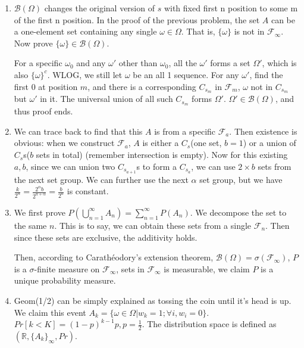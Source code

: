 \documentclass{article}
\theoremstyle{definition}
\begin{document}
\begin{enumerate}
		Then prove $\mathcal F_\infty \neq \Omega$. Let $A$ be an all 1 sequence. No matter how big n is, there can't be a $C_{s_n}=A$. Since $\{C_s\}$ is a partition, we can't get $A$ through intersection. $A$ is not in any of $\mathcal F_n$. $A$ is in $2^\Omega$ but $A$ is not in $\mathcal F_\infty$.
		
		\item $\mathcal B(\Omega)$ changes the original version of $s$ with fixed first n position to some m of the first n position. In the proof of the previous problem, the set $A$ can be a one-element set containing any single $\omega \in \Omega$. That is, $\{\omega\}$ is not in $\mathcal F_\infty$. Now prove $\{\omega\} \in \mathcal B(\Omega)$. 
		
		For a specific $\omega_0$ and any $\omega'$ other than $\omega_0$, all the $\omega'$ forms a set $\Omega'$, which is also $\{\omega\}^c$. WLOG, we still let $\omega$ be an all 1 sequence. For any $\omega'$, find the first 0 at position $m$, and there is a corresponding $C_{s_m}$ in $\mathcal F_m$, $\omega$ not in $C_{s_m}$ but $\omega'$ in it. The universal union of all such $C_{s_m}$ forms $\Omega'$. $\Omega'\in\mathcal B(\Omega)$, and thus proof ends. 		
		
		\item We can trace back to find that this $A$ is from a specific $\mathcal F_a$. Then existence is obvious: when we construct $\mathcal F_a$, $A$ is either a $C_s$(one set, $b=1$) or a union of $C_s$s($b$ sets in total) (remember intersection is empty). Now for this existing $a, b$, since we can union two $C_{s_{a+1}}$s to form a $C_{s_a}$, we can use $2\times b$ sets from the next set group. We can further use the next $\alpha$ set group, but we have $\frac{k}{2^n} = \frac{2^\alpha b}{2^{a+\alpha}} = \frac{b}{2^a}$ is constant.
		
		\item We first prove $P\left(\bigcup_{n=1}^{\infty} A_n\right)=\sum_{n=1}^{\infty} P\left(A_n\right)$. We decompose the set to the same $n$. This is to say, we can obtain these sets from a single $\mathcal F_n$. Then since these sets are exclusive, the additivity holds. 
		
		Then, according to Carathéodory's extension theorem, $\mathcal B(\Omega)=\sigma(\mathcal F_\infty)$, $P$ is a $\sigma$-finite measure on $\mathcal F_\infty$, sets in $\mathcal F_\infty$ is measurable, we claim $P$ is a unique probability measure.
		
		\item Geom(1/2) can be simply explained as tossing the coin until it's head is up. We claim this event $A_k=\{\omega\in\Omega|w_k=1; \forall i,w_i=0\}$. $Pr[k<K] =  (1-p)^{k-1}p, p = \frac{1}{2}$. The distribution space is defined as $(\mathbb R, \{A_k\}_\infty, Pr)$.
	\end{enumerate}
	
\end{document}
